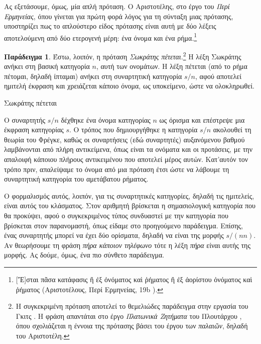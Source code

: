 \documentclass [a4paper,11pt] {book}
\theoremstyle{definition}
\newtheorem{example}[theorem]{Παράδειγμα}
\theoremstyle{definition}
\begin{document}
Ας εξετάσουμε, όμως, μία απλή πρόταση. Ο Αριστοτέλης, στο έργο του \textit{Περί Ερμηνείας}, όπου γίνεται για πρώτη φορά λόγος για τη σύνταξη μιας πρότασης, υποστηρίζει πως το απλούστερο είδος πρότασης είναι αυτή με δύο λέξεις αποτελούμενη από δύο ετερογενή μέρη: ένα όνομα και ένα ρήμα.\footnote{[Ἔ]σται πᾶσα κατάφασις ἢ ἐξ ὀνόματος καὶ ῥήματος ἢ ἐξ ἀορίστου ὀνόματος καὶ ῥήματος (Αριστοτέλους, Περί Ερμηνείας, 19b \citep{aristotle}).}
\begin{example}
\label{ex:SocratesPetetai}
Έστω, λοιπόν, η πρόταση \textit{Σωκράτης πέτεται}.\footnote{Η συγκεκριμένη πρόταση αποτελεί το θεμελιώδες παράδειγμα στην εργασία του Γκιτς \citep{Geach87}. Η φράση απαντάται στο έργο \textit{Πλατωνικά Ζητήματα} του Πλουτάρχου \citep{plutarch}, όπου σχολιάζεται η έννοια της πρότασης βάσει του έργου των \textit{παλαιῶν}, δηλαδή του Αριστοτέλη.} Η λέξη Σωκράτης ανήκει στη βασική κατηγορία $n$, αυτή των ονομάτων. Η λέξη πέτεται (από το ρήμα πέτομαι, δηλαδή ίπταμαι) ανήκει στη συναρτητική κατηγορία $s/n$, αφού αποτελεί ημιτελή έκφραση και χρειάζεται κάποιο όνομα, ως υποκείμενο, ώστε να ολοκληρωθεί.
\begin{center}
Σωκράτης πέτεται\\
\end{center}
O συναρτητής $s/n$ δέχθηκε ένα όνομα κατηγορίας $n$ ως όρισμα και επέστρεψε μια έκφραση κατηγορίας $s$. Ο τρόπος που δημιουργήθηκε η κατηγορία $s/n$ ακολουθεί τη θεωρία του Φρέγκε, καθώς οι συναρτήσεις (εδώ συναρτητές) αυξανόμενου βαθμού λαμβάνονται από πλήρη αντικείμενα, όπως είναι τα ονόματα και οι προτάσεις, με την απαλοιφή κάποιου πλήρους αντικειμένου που αποτελεί μέρος αυτών. Κατ'αυτόν τον τρόπο πριν, απαλείψαμε το όνομα από μια πρόταση έτσι ώστε να λάβουμε τη συναρτητική κατηγορία του αμετάβατου ρήματος. 
\end{example}
Ο φορμαλισμός αυτός, λοιπόν, για τις συναρτητικές κατηγορίες, δηλαδή τις ημιτελείς, είναι αυτός του κλάσματος. Στον αριθμητή βρίσκεται η σημασιολογική κατηγορία που θα προκύψει, αφού ο συγκεκριμένος τύπος συνδυαστεί με την κατηγορία που βρίσκεται στον παρανομαστή, όπως είδαμε στο προηγούμενο παράδειγμα. Επίσης, ένας συναρτητής μπορεί να έχει δύο ορίσματα, δηλαδή να είναι της μορφής $s/(n n)$. Αν θεωρήσουμε τη φράση \textit{πήρα κάποιον τηλέφωνο} τότε η λέξη \textit{πήρα} είναι αυτής της μορφής. Ας δούμε, όμως, ένα πιο σύνθετο παράδειγμα.
\end{document}
